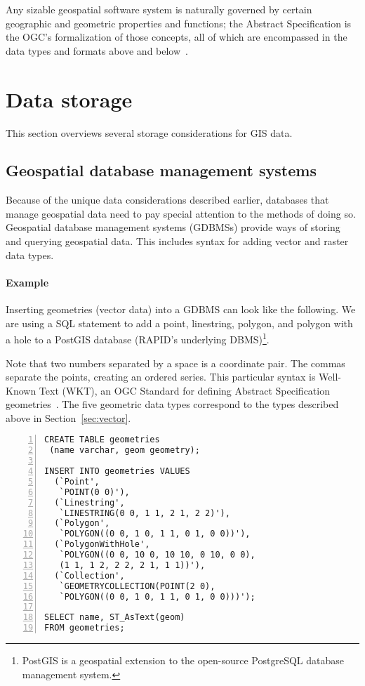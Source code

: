 Any sizable geospatial software system is naturally governed by certain geographic and geometric properties and functions; the Abstract Specification is the OGC's formalization of those concepts, all of which are encompassed in the data types and formats above and below~\cite{AbstractSpecFaq}.

\section{Data storage}
This section overviews several storage considerations for GIS data.

\subsection{Geospatial database management systems}
Because of the unique data considerations described earlier, databases that manage geospatial data need to pay special attention to the methods of doing so. Geospatial database management systems (GDBMSs) provide ways of storing and querying geospatial data. This includes syntax for adding vector and raster data types.

\paragraph{Example}
Inserting geometries (vector data) into a GDBMS can look like the following. We are using a SQL statement to add a point, linestring, polygon, and polygon with a hole to a PostGIS database (RAPID's underlying DBMS)\footnote{PostGIS is a geospatial extension to the open-source PostgreSQL database management system.}.

Note that two numbers separated by a space is a coordinate pair. The commas separate the points, creating an ordered series. This particular syntax is Well-Known Text (WKT), an OGC Standard for defining Abstract Specification geometries~\cite{ogc}. The five geometric data types correspond to the types described above in Section~\ref{sec:vector}.

\begin{Verbatim}[samepage=true,baselinestretch=1,numbers=left,xleftmargin=12mm]
CREATE TABLE geometries
 (name varchar, geom geometry);

INSERT INTO geometries VALUES
  (`Point',
   `POINT(0 0)'),
  (`Linestring',
   `LINESTRING(0 0, 1 1, 2 1, 2 2)'),
  (`Polygon',
   `POLYGON((0 0, 1 0, 1 1, 0 1, 0 0))'),
  (`PolygonWithHole',
   `POLYGON((0 0, 10 0, 10 10, 0 10, 0 0),
   (1 1, 1 2, 2 2, 2 1, 1 1))'),
  (`Collection',
   `GEOMETRYCOLLECTION(POINT(2 0),
   `POLYGON((0 0, 1 0, 1 1, 0 1, 0 0)))');

SELECT name, ST_AsText(geom)
FROM geometries;
\end{Verbatim}

